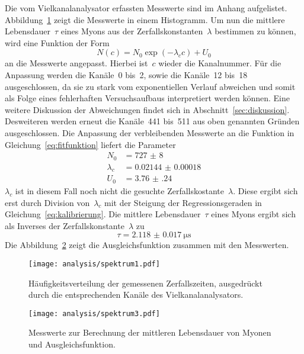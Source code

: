 Die vom Vielkanalanalysator erfassten Messwerte sind im Anhang aufgelistet.
Abbildung~\ref{fig:spektrum1} zeigt die Messwerte in einem Histogramm. Um nun
die mittlere Lebensdauer~$\tau$ eines Myons aus der Zerfallskonstanten~$\lambda$
bestimmen zu können, wird eine Funktion der Form
%
\begin{equation}
  N(c)=N_0\exp\left(-\lambda_cc\right)+U_0
  \label{eq:fitfunktion}
\end{equation}
%
an die Messwerte angepasst. Hierbei ist~$c$ wieder die Kanalnummer. Für die
Anpassung werden die Kanäle~\num{0} bis~\num{2}, sowie die Kanäle~\num{12}
bis~\num{18} ausgeschlossen, da sie zu stark vom exponentiellen Verlauf
abweichen und somit als Folge eines fehlerhaften Versuchsaufbaus interpretiert
werden können. Eine weitere Diskussion der Abweichungen findet sich in
Abschnitt~\ref{sec:diskussion}. Desweiteren werden erneut die Kanäle~\num{441}
bis~\num{511} aus oben genannten Gründen ausgeschlossen. Die Anpassung der
verbleibenden Messwerte an die Funktion in Gleichung~\ref{eq:fitfunktion}
liefert die Parameter
%
\begin{align}
  N_0&=\num{727(8)} \\
  \lambda_c&=\num{0.02144(18)} \\
  U_0&=\num{3.76(24)}
  \label{eq:fitparameter}
\end{align}
%
$\lambda_c$ ist in diesem Fall noch nicht die gesuchte
Zerfallskostante~$\lambda$. Diese ergibt sich erst durch Division
von~$\lambda_c$ mit der Steigung der Regressionsgeraden in
Gleichung~\ref{eq:kalibrierung}. Die mittlere Lebensdauer~$\tau$ eines Myons
ergibt sich als Inverses der Zerfallskonstante~$\lambda$ zu
%
\begin{equation}
  \tau=\SI{2.118(17)}{\micro\second}
  \label{eq:ergebnis}
\end{equation}
%
Die Abbildung~\ref{fig:spektrum3} zeigt die Ausgleichsfunktion zusammen mit den
Messwerten.

\begin{figure}[htb]
  \centering
  \texttt{[image: analysis/spektrum1.pdf]}
  \caption{Häufigkeitsverteilung der gemessenen Zerfallszeiten, ausgedrückt
  durch die entsprechenden Kanäle des Vielkanalanalysators.}
  \label{fig:spektrum1}
\end{figure}

\begin{figure}[htb]
  \centering
  \texttt{[image: analysis/spektrum3.pdf]}
  \caption{Messwerte zur Berechnung der mittleren Lebensdauer von Myonen und
  Ausgleichsfunktion.}
  \label{fig:spektrum3}
\end{figure}
